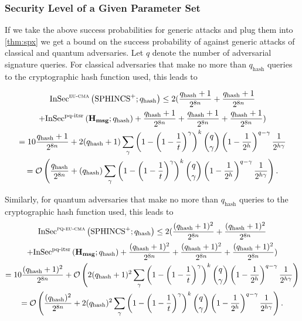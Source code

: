 \subsubsection{Security Level of a Given Parameter Set}
If we take the above success probabilities for generic attacks and plug them
into \autoref{thm:spx} we get a bound on the success probability of \spx
against generic attacks of classical and quantum adversaries. Let $q$ denote
the number of adversarial signature queries.
For classical
adversaries that make no more than $q_{\text{hash}}$ queries to the
cryptographic hash function used, this leads to

\begin{multline}\label{eqn:classical-sec-level}
 {\mathrm{InSec}}^{{\mathsf{\textsc{{eu\text{-}cma}}}}}\left( {{\textrm{SPHINCS}^+}}; {q_{\text{hash}}} \right)  \leq 2(\frac{q_{\text{hash}}+1}{2^{8n}}+\frac{q_{\text{hash}}+1}{2^{8n}} \\
 + {\mathrm{InSec}}^{{\text{pq-itsr}}}\left( {\mathbf{H_{msg}}}; {q_{\text{hash}}} \right) + \frac{q_{\text{hash}}+1}{2^{8n}}+\frac{q_{\text{hash}}+1}{2^{8n}}+\frac{q_{\text{hash}}+1}{2^{8n}})\\
 = 10\frac{q_{\text{hash}}+1}{2^{8n}} + 2(q_{\text{hash}}+1) \sum_\gamma
  \left(1-\left(1-{1\over t}\right)^\gamma\right)^k
  {q\choose \gamma}
  \left(1-{1\over 2^h}\right)^{q-\gamma}
  {1\over 2^{h\gamma}}\\
 = \mathcal{O}\left(\frac{q_{\text{hash}}}{2^{8n}} + (q_{\text{hash}}) \sum_\gamma
  \left(1-\left(1-{1\over t}\right)^\gamma\right)^k
  {q\choose \gamma}
  \left(1-{1\over 2^h}\right)^{q-\gamma}
  {1\over 2^{h\gamma}}\right)
  .
 \end{multline}

Similarly, for quantum adversaries that make no more than $q_{\text{hash}}$ queries to the
cryptographic hash function used, this leads to
\begin{multline}\label{eqn:quantum-sec-level}
 {\mathrm{InSec}}^{{\mathsf{\textsc{{pq\text{-}eu\text{-}cma}}}}}\left( {{\textrm{SPHINCS}^+}}; {q_{\text{hash}}} \right)  \leq 2(\frac{(q_{\text{hash}}+1)^2}{2^{8n}}+\frac{(q_{\text{hash}}+1)^2}{2^{8n}} \\
 + {\mathrm{InSec}}^{{\text{pq-itsr}}}\left( {\mathbf{H_{msg}}}; {q_{\text{hash}}} \right) + \frac{(q_{\text{hash}}+1)^2}{2^{8n}}+\frac{(q_{\text{hash}}+1)^2}{2^{8n}}+\frac{(q_{\text{hash}}+1)^2}{2^{8n}})\\
 = 10\frac{(q_{\text{hash}}+1)^2}{2^{8n}} + \mathcal{O}\left(2(q_{\text{hash}}+1)^2 \sum_\gamma
  \left(1-\left(1-{1\over t}\right)^\gamma\right)^k
  {q\choose \gamma}
  \left(1-{1\over 2^h}\right)^{q-\gamma}
  {1\over 2^{h\gamma}}\right)\\
  = \mathcal{O}\left(\frac{(q_{\text{hash}})^2}{2^{8n}} + 2(q_{\text{hash}})^2 \sum_\gamma
  \left(1-\left(1-{1\over t}\right)^\gamma\right)^k
  {q\choose \gamma}
  \left(1-{1\over 2^h}\right)^{q-\gamma}
  {1\over 2^{h\gamma}}\right).
\end{multline}

